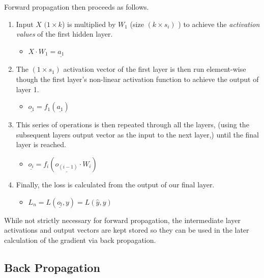 \documentclass[]{book}
\providecommand{\tightlist}{%
  \setlength{\itemsep}{0pt}\setlength{\parskip}{0pt}}
\theoremstyle{definition}
\theoremstyle{definition}
\theoremstyle{definition}
\theoremstyle{remark}
\begin{document}
Forward propagation then proceeds as follows.

\begin{enumerate}
\def\labelenumi{\arabic{enumi}.}
\tightlist
\item
  Input \(X\) \((1 \times k\)) is multiplied by \(W_1\) (size
  \((k\times s_i)\) ) to achieve the \emph{activation values} of the
  first hidden layer.

  \begin{itemize}
  \tightlist
  \item
    \(X \cdot W_1 = \underline{a_1}\)
  \end{itemize}
\item
  The \((1 \times s_1)\) activation vector of the first layer is then
  run element-wise though the first layer's non-linear activation
  function to achieve the output of layer 1.

  \begin{itemize}
  \tightlist
  \item
    \(\underline{o_1} = f_1(\underline{a_1})\)
  \end{itemize}
\item
  This series of operations is then repeated through all the layers,
  (using the subsequent layers output vector as the input to the next
  layer,) until the final layer is reached.

  \begin{itemize}
  \tightlist
  \item
    \(\underline{o_i} = f_i(\underline{o_{(i - 1)}} \cdot W_i)\)
  \end{itemize}
\item
  Finally, the loss is calculated from the output of our final layer.

  \begin{itemize}
  \tightlist
  \item
    \(L_n = L(\underline{o_l}, y) = L(\hat{y}, y)\)
  \end{itemize}
\end{enumerate}

While not strictly necessary for forward propagation, the intermediate
layer activations and output vectors are kept stored so they can be used
in the later calculation of the gradient via back propagation.

\subsection{Back Propagation}\label{back-propagation}
\end{document}
